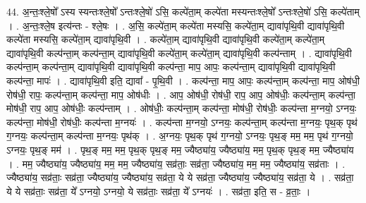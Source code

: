 \documentclass[17pt]{extarticle}
\begin{document}
44. अ॒न्तः॒श्ले॒षो᳚ ऽस्य स्यन्तःश्ले॒षो᳚ ऽन्तःश्ले॒षो॑ ऽसि॒ कल्पे॑ता॒म् कल्पे॑ता मस्यन्तःश्ले॒षो᳚ ऽन्तःश्ले॒षो॑ ऽसि॒ कल्पे॑ताम् । . अ॒न्तः॒श्ले॒ष इत्य॑न्तः - श्ले॒षः । . अ॒सि॒ कल्पे॑ता॒म् कल्पे॑ता मस्यसि॒ कल्पे॑ता॒म् द्यावा॑पृथि॒वी द्यावा॑पृथि॒वी कल्पे॑ता मस्यसि॒ कल्पे॑ता॒म् द्यावा॑पृथि॒वी । . कल्पे॑ता॒म् द्यावा॑पृथि॒वी द्यावा॑पृथि॒वी कल्पे॑ता॒म् कल्पे॑ता॒म् द्यावा॑पृथि॒वी कल्प॑न्ता॒म् कल्प॑न्ता॒म् द्यावा॑पृथि॒वी कल्पे॑ता॒म् कल्पे॑ता॒म् द्यावा॑पृथि॒वी कल्प॑न्ताम् । . द्यावा॑पृथि॒वी कल्प॑न्ता॒म् कल्प॑न्ता॒म् द्यावा॑पृथि॒वी द्यावा॑पृथि॒वी कल्प॑न्ता॒ माप॒ आपः॒ कल्प॑न्ता॒म् 
द्यावा॑पृथि॒वी द्यावा॑पृथि॒वी कल्प॑न्ता॒ मापः॑ । . द्यावा॑पृथि॒वी इति॒ द्यावा᳚ - पृ॒थि॒वी । . कल्प॑न्ता॒ माप॒ आपः॒ कल्प॑न्ता॒म् कल्प॑न्ता॒ माप॒ ओष॑धी॒ रोष॑धी॒ रापः॒ कल्प॑न्ता॒म् कल्प॑न्ता॒ माप॒ ओष॑धीः । . आप॒ ओष॑धी॒ रोष॑धी॒ राप॒ आप॒ ओष॑धीः॒ कल्प॑न्ता॒म् कल्प॑न्ता॒ मोष॑धी॒ राप॒ आप॒ ओष॑धीः॒ कल्प॑न्ताम् । . ओष॑धीः॒ कल्प॑न्ता॒म् कल्प॑न्ता॒ मोष॑धी॒ रोष॑धीः॒ कल्प॑न्ता म॒ग्नयो॒ ऽग्नयः॒ कल्प॑न्ता॒ मोष॑धी॒ रोष॑धीः॒ कल्प॑न्ता म॒ग्नयः॑ । . कल्प॑न्ता म॒ग्नयो॒ ऽग्नयः॒ कल्प॑न्ता॒म् कल्प॑न्ता म॒ग्नयः॒ पृथ॒क् पृथ॑ ग॒ग्नयः॒ कल्प॑न्ता॒म् कल्प॑न्ता म॒ग्नयः॒ पृथ॑क् । . अ॒ग्नयः॒ पृथ॒क् पृथ॑ ग॒ग्नयो॒ ऽग्नयः॒ पृथ॒ङ् मम॒ मम॒ पृथ॑ ग॒ग्नयो॒ ऽग्नयः॒ पृथ॒ङ् मम॑ । . पृथ॒ङ् मम॒ मम॒ पृथ॒क् पृथ॒ङ् मम॒ ज्यैष्ठ्या॑य॒ ज्यैष्ठ्या॑य॒ मम॒ पृथ॒क् पृथ॒ङ् मम॒ ज्यैष्ठ्या॑य । . मम॒ ज्यैष्ठ्या॑य॒ ज्यैष्ठ्या॑य॒ मम॒ मम॒ ज्यैष्ठ्या॑य॒ सव्र॑ताः॒ सव्र॑ता॒ ज्यैष्ठ्या॑य॒ मम॒ मम॒ ज्यैष्ठ्या॑य॒ सव्र॑ताः । . ज्यैष्ठ्या॑य॒ सव्र॑ताः॒ सव्र॑ता॒ ज्यैष्ठ्या॑य॒ ज्यैष्ठ्या॑य॒ सव्र॑ता॒ ये ये सव्र॑ता॒ ज्यैष्ठ्या॑य॒ ज्यैष्ठ्या॑य॒ सव्र॑ता॒ ये । . सव्र॑ता॒ ये ये सव्र॑ताः॒ सव्र॑ता॒ ये᳚ ऽग्नयो॒ ऽग्नयो॒ ये सव्र॑ताः॒ सव्र॑ता॒ ये᳚ ऽग्नयः॑ । . सव्र॑ता॒ इति॒ स - व्र॒ताः॒ । \newline
\pagebreak
{}
\end{document}
